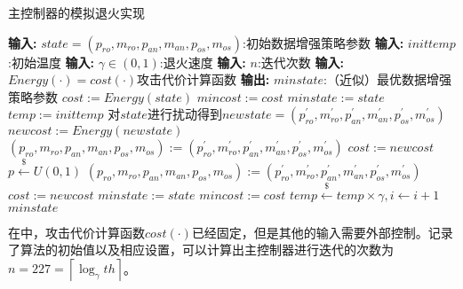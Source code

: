 {	\begin{breakablealgorithm}
		\caption{主控制器的模拟退火实现}\label{alg:saincontroller}
		\begin{algorithmic}[1]
			\Statex \textbf{输入:} $state=(p_{ro},m_{ro},p_{an},m_{an},p_{os},m_{os})$:初始数据增强策略参数
			\Statex \textbf{输入:} $inittemp$:初始温度
			\Statex \textbf{输入:} $\gamma\in(0,1)$:退火速度
			\Statex \textbf{输入:} $n$:迭代次数
			\Statex \textbf{输入:} $Energy(\cdot)=cost(\cdot)$攻击代价计算函数
			\Statex \textbf{输出:} $minstate$:（近似）最优数据增强策略参数
			\State $cost := Energy(state)$
			\State $mincost:=cost$
			\State $minstate:=state$
			\State $temp:=inittemp$
			\Repeat
			\State 对$state$进行扰动得到$newstate=(p_{ro}^\prime,m_{ro}^\prime,p_{an}^\prime,m_{an}^\prime,p_{os}^\prime,m_{os}^\prime)$
			\State $newcost:=Energy(newstate)$
			\State $(p_{ro},m_{ro},p_{an},m_{an},p_{os},m_{os}):=(p_{ro}^\prime,m_{ro}^\prime,p_{an}^\prime,m_{an}^\prime,p_{os}^\prime,m_{os}^\prime)$
			\State $cost:= newcost$
			\Else
			\State $p\stackrel{\$}\gets U(0,1)$
			\State $(p_{ro},m_{ro},p_{an},m_{an},p_{os},m_{os}):=(p_{ro}^\prime,m_{ro}^\prime,p_{an}^\prime,m_{an}^\prime,p_{os}^\prime,m_{os}^\prime)$
			\State$cost:= newcost$
			\EndIf
			\EndIf
			\State $minstate:= state$
			\State $mincost:= cost$
			\EndIf
			\State $temp\stackrel{\$}\gets temp\times\gamma,i\gets i+1$
			\EndFor
			\State \Return $minstate$
		\end{algorithmic}
	\end{breakablealgorithm}
	
	在中，攻击代价计算函数$cost(\cdot)$已经固定，但是其他的输入需要外部控制。记录了算法的初始值以及相应设置，可以计算出主控制器进行迭代的次数为$n=227=\left\lceil\log_{\gamma}{th} \right\rceil$。
	
}
